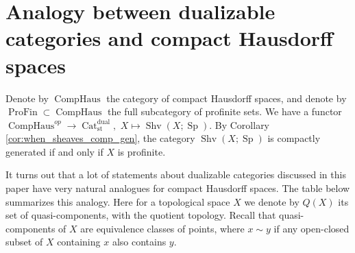 \documentclass[11pt,leqno]{amsart}
\numberwithin{equation}{section}
\newcommand{\profin}{\operatorname{ProFin}}
\newcommand{\comphaus}{\operatorname{CompHaus}}
\newcommand{\Cat}{\operatorname{Cat}}
\newcommand{\st}{\operatorname{st}}
\newcommand{\dual}{\operatorname{dual}}
\newcommand{\Sh}{\operatorname{Shv}}
\newcommand{\Sp}{\operatorname{Sp}}
\begin{document}
\section{Analogy between dualizable categories and compact Hausdorff spaces}
\label{app:analogy_dualizable_comphaus}

Denote by $\comphaus$ the category of compact Hausdorff spaces, and denote by $\profin\subset\comphaus$ the full subcategory of profinite sets. We have a functor $\comphaus^{op}\to\Cat_{\st}^{\dual},$ $X\mapsto \Sh(X;\Sp).$ By Corollary \ref{cor:when_sheaves_comp_gen}, the category $\Sh(X;\Sp)$ is compactly generated if and only if $X$ is profinite. 

It turns out that a lot of statements about dualizable categories discussed in this paper have very natural analogues for compact Hausdorff spaces. The table below summarizes this analogy. Here for a topological space $X$ we denote by $Q(X)$ its set of quasi-components, with the quotient topology. Recall that quasi-components of $X$ are equivalence classes of points, where $x\sim y$ if any open-closed subset of $X$ containing $x$ also contains $y.$
\end{document}
